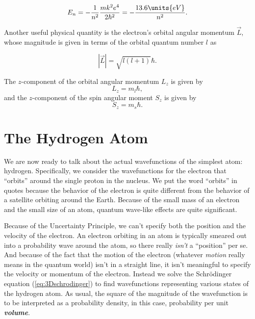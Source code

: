 \begin{equation}
\label{eq:hydrogenE}
E_n = -\frac{1}{n^2} \frac{m k^2 e^4}{2 \hbar^2} 
= - \frac{13.6 \units{eV}}{n^2}  .
\end{equation}

Another useful physical quantity is the electron's orbital angular
momentum $\vec{L}$, whose magnitude is given in terms of the orbital
quantum number $l$ as

\begin{equation}
\label{eq:Lmag}
|\vec{L}| = \sqrt{l (l + 1)} \hbar  .
\end{equation}

The $z$-component of the orbital angular momentum $L_z$ is
given by
\begin{equation}
\label{eq:Lcomponent}
L_z = m_l \hbar  ,
\end{equation}
and the $z$-component of the spin angular moment $S_z$ is given by
\begin{equation}
\label{eq:Scomponent}
S_z = m_s \hbar .
\end{equation}

\section{The Hydrogen Atom}
\label{sec:hydrogen_atom}

We are now ready to talk about the actual wavefunctions of the
simplest atom: hydrogen.  Specifically, we consider the wavefunctions
for the electron that ``orbits'' around the single proton in the
nucleus.  We put the word ``orbits'' in quotes because the behavior of
the electron is quite different from the behavior of a satellite
orbiting around the Earth. Because of the small mass of an electron
and the small size of an atom, quantum wave-like effects are quite
significant.

Because of the Uncertainty Principle, we can't specify both the
position and the velocity of the electron. An electron orbiting in an
atom is typically smeared out into a probability wave around the atom,
so there really {\it isn't\/} a ``position'' per se.  And because of
the fact that the motion of the electron (whatever {\it motion\/}
really means in the quantum world) isn't in a straight line, it isn't
meaningful to specify the velocity or momentum of the
electron. Instead we solve the Schr\"{o}dinger equation
(\ref{eq:3Dschrodinger}) to find wavefunctions representing various
states of the hydrogen atom.  As usual, the square of the magnitude of
the wavefunction is to be interpreted as a probability density, in
this case, probability per unit {\bf {\em volume}}.

